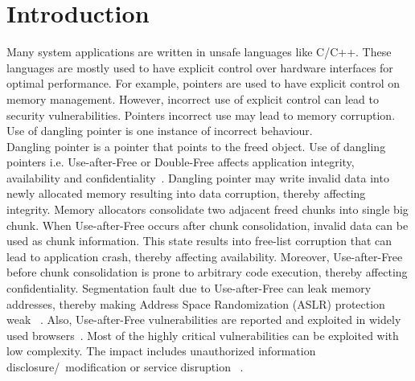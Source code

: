 \section{Introduction}
Many system applications are written in unsafe languages like C/C++. These languages are mostly used to have explicit control over hardware interfaces for optimal performance. For example, pointers are used to have explicit control on memory management. However, incorrect use of explicit control can lead to security vulnerabilities. Pointers incorrect use may lead to memory corruption. Use of dangling pointer is one instance of incorrect behaviour. \\

Dangling pointer is a pointer that points to the freed object. Use of dangling pointers i.e. Use-after-Free or Double-Free affects application integrity, availability and confidentiality~\cite{CVEMitre}. Dangling pointer may write invalid data into newly allocated memory resulting into data corruption, thereby affecting integrity. Memory allocators consolidate two adjacent freed chunks into single big chunk. When Use-after-Free occurs after chunk consolidation, invalid data can be used as chunk information. This state results into free-list corruption that can lead to application crash, thereby affecting availability. Moreover, Use-after-Free before chunk consolidation is prone to arbitrary code execution, thereby affecting confidentiality. Segmentation fault due to Use-after-Free can leak memory addresses, thereby making Address Space Randomization (ASLR) protection weak ~\cite{serna2012info}. Also, Use-after-Free vulnerabilities are reported and exploited in widely used browsers~\cite{tutorial2010internet, IRCVE}. Most of the highly critical vulnerabilities can be exploited with low complexity. The impact includes unauthorized information disclosure/~modification or service disruption ~\cite{NVDNist}. \\

